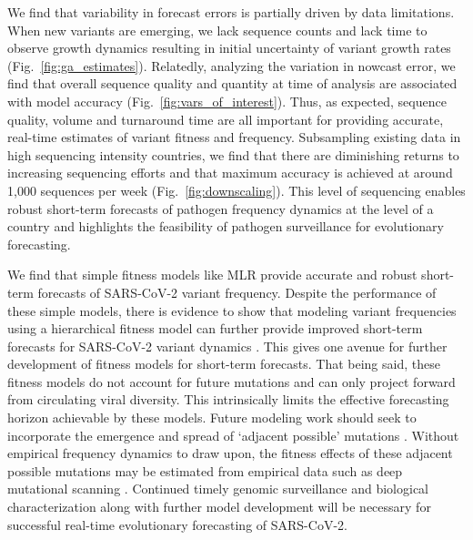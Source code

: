 \documentclass[11pt,oneside,letterpaper]{article}
\begin{document}

We find that variability in forecast errors is partially driven by data limitations.
When new variants are emerging, we lack sequence counts and lack time to observe growth dynamics resulting in initial uncertainty of variant growth rates (Fig.~\ref{fig:ga_estimates}).
Relatedly, analyzing the variation in nowcast error, we find that overall sequence quality and quantity at time of analysis are associated with model accuracy (Fig.~\ref{fig:vars_of_interest}).
Thus, as expected, sequence quality, volume and turnaround time are all important for providing accurate, real-time estimates of variant fitness and frequency.
Subsampling existing data in high sequencing intensity countries, we find that there are diminishing returns to increasing sequencing efforts and that maximum accuracy is achieved at around 1,000 sequences per week (Fig.~\ref{fig:downscaling}).
This level of sequencing enables robust short-term forecasts of pathogen frequency dynamics at the level of a country and highlights the feasibility of pathogen surveillance for evolutionary forecasting.


We find that simple fitness models like MLR provide accurate and robust short-term forecasts of SARS-CoV-2 variant frequency.
Despite the performance of these simple models, there is evidence to show that modeling variant frequencies using a hierarchical fitness model can further provide improved short-term forecasts for SARS-CoV-2 variant dynamics \cite{susswein2023leveraging}.
This gives one avenue for further development of fitness models for short-term forecasts.
That being said, these fitness models do not account for future mutations and can only project forward from circulating viral diversity.
This intrinsically limits the effective forecasting horizon achievable by these models.
Future modeling work should seek to incorporate the emergence and spread of `adjacent possible' mutations \cite{kauffman1993origins}.
Without empirical frequency dynamics to draw upon, the fitness effects of these adjacent possible mutations may be estimated from empirical data such as deep mutational scanning \cite{cao2022ba, greaney2022antibody, dadonaite2023full}.
Continued timely genomic surveillance and biological characterization along with further model development will be necessary for successful real-time evolutionary forecasting of SARS-CoV-2.
\end{document}
